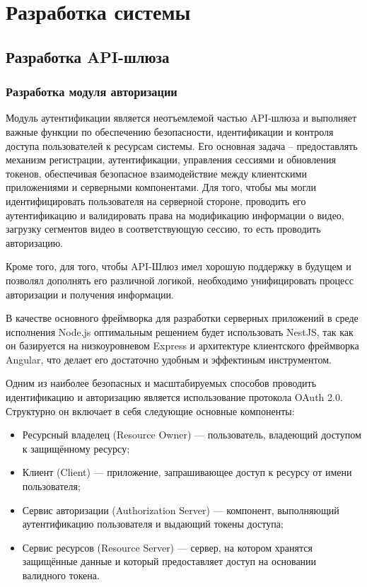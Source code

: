 \chapter{Разработка системы} \label{ch3}

	\section{Разработка API-шлюза}

	\subsection{Разработка модуля авторизации}

	Модуль аутентификации является неотъемлемой частью API-шлюза и выполняет важные функции по обеспечению безопасности, идентификации и контроля доступа пользователей к ресурсам системы. Его основная задача – предоставлять механизм регистрации, аутентификации, управления сессиями и обновления токенов, обеспечивая безопасное взаимодействие между клиентскими приложениями и серверными компонентами. Для того, чтобы мы могли идентифицировать пользователя на серверной стороне, проводить его аутентификацию и валидировать права на модификацию информации о видео, загрузку сегментов видео в соответствующую сессию, то есть проводить авторизацию.

	Кроме того, для того, чтобы API-Шлюз имел хорошую поддержку в будущем и позволял дополнять его различной логикой, необходимо унифицировать процесс авторизации и получения информации.
	
	В качестве основного фреймворка для разработки серверных приложений в среде исполнения Node.js оптимальным решением будет использовать NestJS, так как он базируется на низкоуровневом Express и архитектуре клиентского фреймворка Angular, что делает его достаточно удобным и эффектиным инструментом.

	Одним из наиболее безопасных и масштабируемых способов проводить идентификацию и авторизацию является использование протокола OAuth 2.0.
	Структурно он включает в себя следующие основные компоненты:

	\begin{itemize}[label=$\bullet$]
		\item Ресурсный владелец (Resource Owner) — пользователь, владеющий доступом к защищённому ресурсу;
		\item Клиент (Client) — приложение, запрашивающее доступ к ресурсу от имени пользователя;
		\item Сервис авторизации (Authorization Server) — компонент, выполняющий аутентификацию пользователя и выдающий токены доступа;
		\item Сервис ресурсов (Resource Server) — сервер, на котором хранятся защищённые данные и который предоставляет доступ на основании валидного токена.
	\end{itemize}

